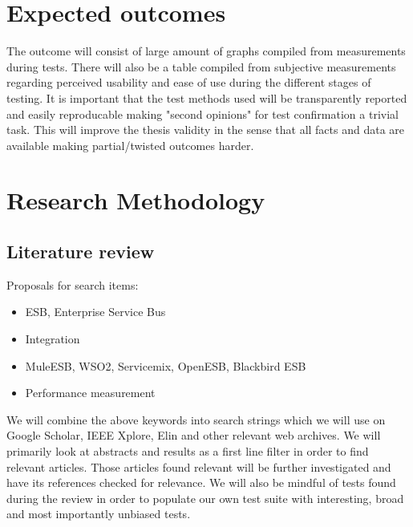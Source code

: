 \documentclass[10pt,a4paper]{proposal}
\begin{document}
\section*{Expected outcomes}
The outcome will consist of large amount of graphs compiled from measurements during tests.
There will also be a table compiled from subjective measurements regarding perceived usability and ease of use during the different stages of testing.
It is important that the test methods used will be transparently reported and easily reproducable making "second opinions" for test confirmation a trivial task. 
This will improve the thesis validity in the sense that all facts and data are available making partial/twisted outcomes harder.


\section*{Research Methodology}

	\subsection{Literature review}
	Proposals for search items:
	\begin{itemize}
		\item ESB, Enterprise Service Bus
		\item Integration
		\item MuleESB, WSO2, Servicemix, OpenESB, Blackbird ESB
		\item Performance measurement
	\end{itemize}
	We will combine the above keywords into search strings which we will use on Google Scholar, IEEE Xplore, Elin and other relevant web archives.
	We will primarily look at abstracts and results as a first line filter in order to find relevant articles. Those articles found relevant will be further investigated and have its references checked for relevance.
	We will also be mindful of tests found during the review in order to populate our own test suite with interesting, broad and most importantly unbiased tests.
\end{document}
